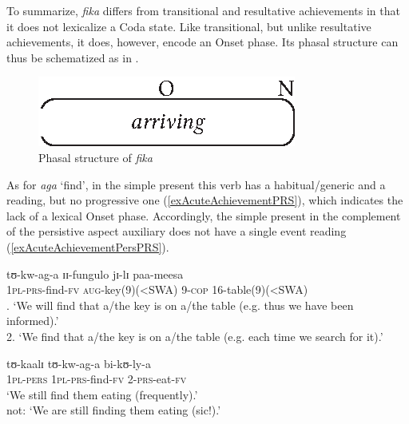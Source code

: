 \begin{exe}
\end{exe}

To summarize, \textit{fika} differs from transitional and resultative achievements in that it does not lexicalize a Coda state. Like transitional, but unlike resultative achievements, it does, however, encode an Onset phase. Its phasal structure can thus be schematized as in 
.
\begin{figure}[h]
\begin{center}
\includegraphics{figures/GrafikInceptiveAchievement.eps}
\caption{Phasal structure of \textit{fika}}
\label{FigureInceptiveAchievement}
\end{center}
\end{figure}

As for \textit{aga} \lq find', in the simple present this verb has a habitual/generic and a  reading, but no progressive one (\ref{exAcuteAchievementPRS}), which indicates the lack of a lexical Onset phase. Accordingly, the simple present in the complement of the persistive aspect auxiliary does not have a single event reading (\ref{exAcuteAchievementPersPRS}).

\begin{exe}
\ex \label{exAcuteAchievementPRS}
 \gll tʊ-kw-ag-a ɪɪ-fungulo jɪ-lɪ paa-meesa\\
\textsc{1pl}-\textsc{prs}-find-\textsc{fv} \textsc{aug}-key(9)(<SWA) 9-\textsc{cop} 16-table(9)(<SWA)\\
. \lq We will find that a/the key is on a/the table (e.g. thus we have 
been informed).'\\
2. \lq We find that a/the key is on a/the table (e.g. each time we search for it).'

\ex \label{exAcuteAchievementPersPRS}\gll tʊ-kaalɪ tʊ-kw-ag-a bi-kʊ-ly-a\\
\textsc{1pl}-\textsc{pers} \textsc{1pl}-\textsc{prs}-find-\textsc{fv} 
2-\textsc{prs}-eat-\textsc{fv}\\
\glt \lq We still find them eating (frequently).'\\
not: \lq We are still finding them eating (sic!).'
\end{exe}

